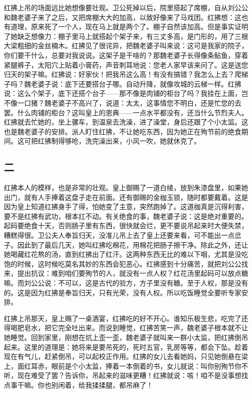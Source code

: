 红拂上吊的场面远比她想像要壮观。卫公死掉以后，院里搭起了席棚，自从刘公公和魏老婆子来了之后，又把席棚大大的加高，以致好像来了马戏团。红拂想：这也有道理，原来死了一个人，现在马上就是两个了。棚子自然该加高。但是事实证明了她缺乏想像力：棚子里马上就搭起个架子来，有三丈多高，是门形的，用了三根大梁粗细的金丝楠木。红拂见了很诧异，把魏老婆子叫来说：这可是我家的院子，你们要干什么，总要对我说说。这架子是干啥的？那魏老婆子长得像条鲇鱼，穿着紧腿裤子，太阳穴上贴着小膏药，声音刺耳地说：您老人家早该来问了。这是送您归天的架子嘛。红拂说：好家伙！把我吊这么高！有没有搞错？我怎么上去？爬梯子吗？魏老婆子说：底下还要搭台子哪。自动升降，就像攻城的云梯一样。红拂说：这么个架子，底下还搭个台子——那不像是肉铺的柜台了吗？我挂在上面，岂不像一口猪？魏老婆子不高兴了，说道：太太，这事情您不明白，还是忙您的去罢。什么肉铺的柜台？这叫皇上的恩典——一点水平都没有，还当什么节烈夫人。红拂就去忙她的，坐上骡车，到温泉去洗澡，进了澡堂，身后还跟了个小太监。这也是魏老婆子的安排。派人盯住红拂，不让她吃东西，因为她正在殉节前的绝食期间。这可把红拂制得够呛，洗完澡出来，小风一吹，她就休克了。 

\subsection{二} 

红拂本人的模样，也是非常的壮观。皇上御赐了一道白绫，放到朱漆盘里，如果她出门，就有人手捧着这盘子走在前面。还有御赐的金枷玉锁，随时都要戴着。这是因为皇上知道红拂身手了得，怕她变了主意，突然跑掉了。这道枷真是沉得利害，要不是红拂有武功，根本扛不动。有关绝食的事，魏老婆子说：这是绝对重要的。起码要绝食十天，否则肠子里有东西，很快就会烂，更不要说吊起来时大便失禁，糟糕得很。卫公夫人奉旨归天，没准儿吊上去了皇上还要来看，可不能出一点岔子。因此到了最后几天，她叫红拂吃棉花，用棉花把肠子擦干净。除此之外，还让她喝藏红花熬的汤，直到红拂出了红汗。这两种东西无比的难以下咽，尤其是没吃饱的时候，这时候吃莫名其妙的东西会犯恶心。红拂感到十分痛苦，就把刘公公找来，提出抗议：难到咱们要殉节的人，就没有一点人权？红花汤里起码可以放点糖嘛。而刘公公说：不可以，这是古代的验方，方子里没有糖。至于人权，那是没有的。这是因为红拂是奉旨归天，只有光荣，没有人权。所以吃饭睡觉全要听专家安排。 

红拂上吊那天，皇上赐了一桌酒宴，红拂吃的好不开心。谁知乐极生悲，吃完了还得喝肥皂水，把它完全吐出来。而说到睡觉，红拂苦笑一声，魏老婆子根本就不让她睡觉。回到家里，刚想在炕上歪一歪，魏老婆子就叫来一群小太监，把红拂倒吊起来。这里的道理是：她将来是要吊死的，死时五官，乳房等等，都会下坠。趁着现在有气儿，赶紧倒吊，可以起校正作用。红拂的女儿去看她妈，只见她倒悬在梁上，面红耳赤，眼前是个小太监，捧着一本倒着的书，女儿就说：叫你别殉节你不听，现在难受了罢？告诉你，吊起来的滋味更糟！红拂就说：咳！咱不是没事想找点事干嘛。你也别闲着，给我揉揉腿，都吊麻了！ 

